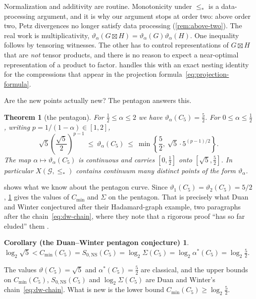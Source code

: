 \documentclass[11pt]{article}
\newtheorem{mainthm}{Theorem}
\newtheorem*{pentcor}{Corollary (the Duan--Winter pentagon conjecture)}
\theoremstyle{definition}
\newcommand{\vt}{\vartheta}
\newcommand{\cG}{\mathcal G}
\newcommand{\Cmin}{C_{\min}}
\newcommand{\SNS}{S_{0,\mathrm{NS}}}
\newcommand{\Xs}{X(\cG,\le_*)}
\newcommand{\boxt}{\boxtimes}
\begin{document}
Normalization and additivity are routine.  Monotonicity under $\le_*$ is a
data-processing argument, and it is why our argument stops at order two:
above order two, Petz divergences no longer satisfy data processing
(\cref{rem:above-two}).  The real work is
multiplicativity, $\vt_\alpha(G\boxt H)=\vt_\alpha(G)\vt_\alpha(H)$.  One
inequality follows by tensoring witnesses.  The other has to control
representations of $G\boxt H$ that are \emph{not} tensor products, and there
is no reason to expect a near-optimal representation of a product to factor.
 handles this with an exact nesting identity for the
compressions that appear in the projection formula~\eqref{eq:projection-formula}.

Are the new points actually new?  The pentagon answers this.

\begin{mainthm}[the pentagon]\label{thm:B}
For $\tfrac12\le\alpha\le2$ we have $\vt_\alpha(C_5)=\tfrac52$.  For
$0\le\alpha\le\tfrac12$, writing $p=1/(1-\alpha)\in[1,2]$,
\begin{equation}\label{eq:pentagon-intro}
 \sqrt5\left(\frac{\sqrt5}{2}\right)^{p-1}
 \ \le\ \vt_\alpha(C_5)\ \le\
 \min\left\{\frac52,\ \sqrt5\cdot5^{(p-1)/2}\right\}.
\end{equation}
The map $\alpha\mapsto\vt_\alpha(C_5)$ is continuous and carries
$[0,\tfrac12]$ onto $[\sqrt5,\tfrac52]$.  In particular $\Xs$ contains
continuum many distinct points of the form $\vt_\alpha$.
\end{mainthm}

 shows what we know about the pentagon curve.
Since $\vt_1(C_5)=\vt_2(C_5)=5/2$, \cref{thm:B} gives the values of $\Cmin$
and $\Sigma$ on the pentagon.  That is precisely what Duan and Winter
conjectured after their Hadamard-graph example, two paragraphs after the
chain~\eqref{eq:dw-chain}, where they note that a rigorous
proof ``has so far eluded'' them \cite[Eq.~(54), which is (53) in
arXiv:1409.3426v3, and the discussion after it]{DuanWinter2016}.

\begin{pentcor}
$\log_2\sqrt5<\Cmin(C_5)=\SNS(C_5)=\log_2\Sigma(C_5)=\log_2\alpha^*(C_5)
=\log_2\tfrac52.$
\end{pentcor}

The values $\vt(C_5)=\sqrt5$ \cite{Lovasz1979} and $\alpha^*(C_5)=\frac52$
\cite{Shannon1956} are classical, and the upper bounds on $\Cmin(C_5)$,
$\SNS(C_5)$ and $\log_2\Sigma(C_5)$ are Duan and Winter's
chain~\eqref{eq:dw-chain}.  What is new is the lower bound
$\Cmin(C_5)\ge\log_2\frac52$.
\end{document}
